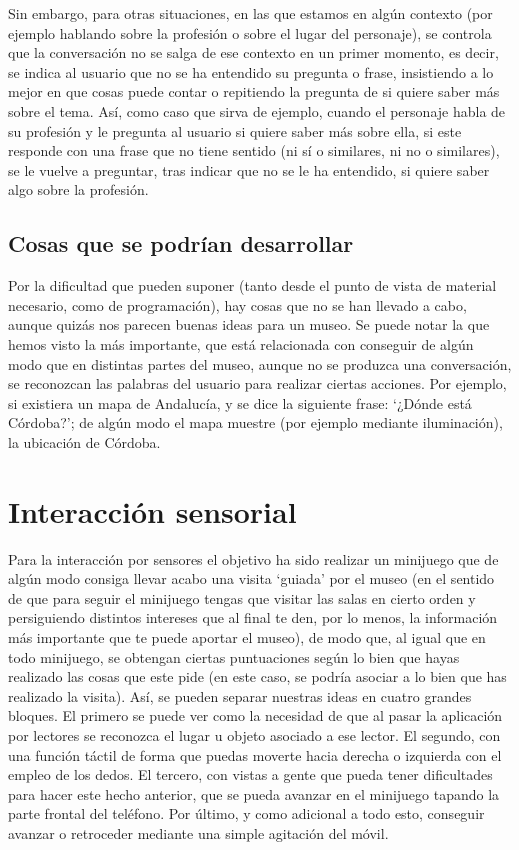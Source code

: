 \documentclass{article}
\begin{document}
Sin embargo, para otras situaciones, en las que estamos en algún contexto (por ejemplo hablando sobre la profesión o sobre el lugar del personaje), se controla que la conversación no se salga de ese contexto en un primer momento, es decir, se indica al usuario que no se ha entendido su pregunta o  frase, insistiendo a lo mejor en que cosas puede contar o repitiendo la pregunta de si quiere saber más sobre el tema. Así, como caso que sirva de ejemplo, cuando el personaje habla de su profesión y le pregunta al usuario si quiere saber más sobre ella, si este responde con una frase que no tiene sentido (ni sí o similares, ni no o similares), se le vuelve a preguntar, tras indicar que no se le ha entendido, si quiere saber algo sobre la profesión.\\

\subsection*{Cosas que se podrían desarrollar}

Por la dificultad que pueden suponer (tanto desde el punto de vista de material necesario, como de programación), hay cosas que no se han llevado a cabo, aunque quizás nos parecen buenas ideas para un museo. Se puede notar la que hemos visto la más importante, que está relacionada con conseguir de algún modo que en distintas partes del museo, aunque no se produzca una conversación, se reconozcan las palabras del usuario para realizar ciertas acciones. Por ejemplo, si existiera un mapa de Andalucía, y se dice la siguiente frase: `¿Dónde está Córdoba?'; de algún modo el mapa muestre (por ejemplo mediante iluminación), la ubicación de Córdoba. 

\section{Interacción sensorial}

Para la interacción por sensores el objetivo ha sido realizar un minijuego que de algún modo consiga llevar acabo una visita `guiada' por el museo (en el sentido de que para seguir el minijuego tengas que visitar las salas en cierto orden y persiguiendo distintos intereses que al final te den, por lo menos, la información más importante que te puede aportar el museo), de modo que, al igual que en todo minijuego, se obtengan ciertas puntuaciones según lo bien que hayas realizado las cosas que este pide (en este caso, se podría asociar a lo bien que has realizado la visita). Así, se pueden separar nuestras ideas en cuatro grandes bloques. El primero se puede ver como la necesidad de que al pasar la aplicación por lectores se reconozca el lugar u objeto asociado a ese lector. El segundo, con una función táctil de forma que puedas moverte hacia derecha o izquierda con el empleo de los dedos. El tercero, con vistas a gente que pueda tener dificultades para hacer este hecho anterior, que se pueda avanzar en el minijuego tapando la parte frontal del teléfono. Por último, y como adicional a todo esto, conseguir avanzar o retroceder mediante una simple agitación del móvil.
\end{document}
